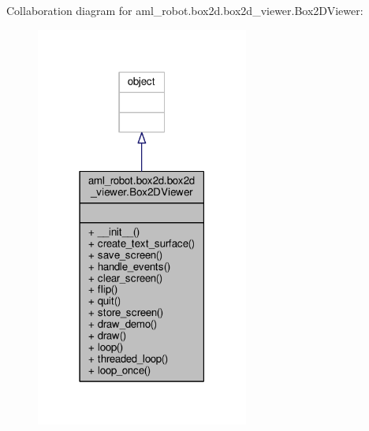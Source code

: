 Collaboration diagram for aml\-\_\-robot.\-box2d.\-box2d\-\_\-viewer.\-Box2\-D\-Viewer\-:\nopagebreak
\begin{figure}[H]
\begin{center}
\leavevmode
\includegraphics[width=198pt]{classaml__robot_1_1box2d_1_1box2d__viewer_1_1_box2_d_viewer__coll__graph}
\end{center}
\end{figure}
